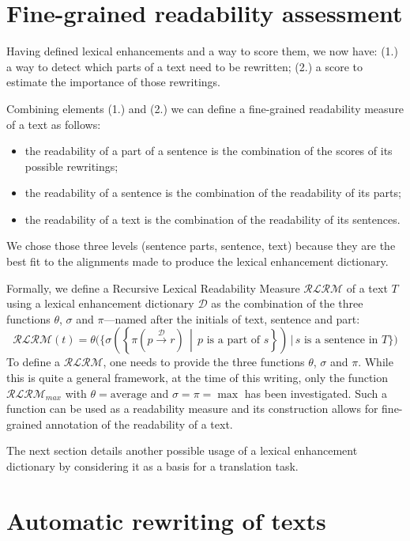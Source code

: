 \documentclass[a4paper, 11pt, onepage]{scrreprt}
\newcommand\maps[1]{\xrightarrow{\mathcal{#1}}}
\newcommand\suchthat{\, \middle| \,}
\begin{document}
\section{Fine-grained readability assessment}
\label{sec:fine-grain-read}

Having defined lexical enhancements and a way to score them, we now
have: (1.) a way to detect which parts of a text need to be rewritten;
(2.) a score to estimate the importance of those rewritings.

Combining elements (1.) and (2.) we can define a fine-grained
readability measure of a text as follows:

\begin{itemize}
\item the readability of a part of a sentence is the combination of
  the scores of its possible rewritings;
\item the readability of a sentence is the combination of the
  readability of its parts;
\item the readability of a text is the combination of the readability
  of its sentences.
\end{itemize}

We chose those three levels (sentence parts, sentence, text) because
they are the best fit to the alignments made to produce the lexical
enhancement dictionary.

Formally, we define a Recursive Lexical Readability Measure
$\mathcal{RLRM}$ of a text $T$ using a lexical enhancement dictionary
$\mathcal{D}$ as the combination of the three functions $\theta$,
$\sigma$ and $\pi$—named after the initials of text, sentence and
part:
\[
\mathcal{RLRM}(t) = \theta\Bigg(\Bigg\{ \sigma \left(\left\{ \pi(p
    \maps{D} r) \suchthat \text{$p$ is a part of $s$}\right\}\right)
\,\Bigg|\, \text{$s$ is a sentence in $T$} \Bigg\}\Bigg)
\]
To define a $\mathcal{RLRM}$, one needs to provide the three functions
$\theta$, $\sigma$ and $\pi$. While this is quite a general framework,
at the time of this writing, only the function $\mathcal{RLRM}_{max}$
with $\theta = \text{average}$ and $\sigma = \pi = \max$ has been
investigated. Such a function can be used as a readability measure and
its construction allows for fine-grained annotation of the readability
of a text.

The next section details another possible usage of a lexical
enhancement dictionary by considering it as a basis for a translation
task.

\section{Automatic rewriting of texts}
\label{sec:rewriting}
\end{document}
